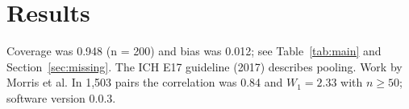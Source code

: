 \documentclass{article}
\begin{document}
\section{Results}\label{sec:results}
Coverage was 0.948 (n = 200) and bias was 0.012; see Table~\ref{tab:main} and Section~\ref{sec:missing}.
The ICH E17 guideline (2017) describes pooling.\cite{iche17,missingkey} Work by Morris et al.\cite{morris2019}
In 1,503 pairs the correlation was 0.84 and $W_1 = 2.33$ with $n \geq 50$; software version 0.0.3.
\end{document}
